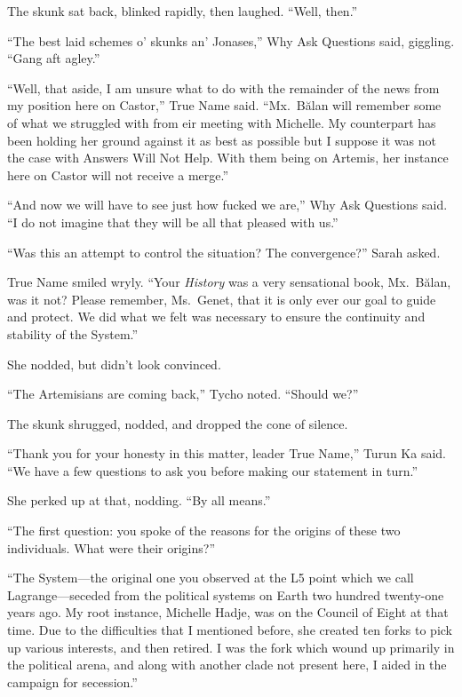 The skunk sat back, blinked rapidly, then laughed. ``Well, then.''

``The best laid schemes o' skunks an' Jonases,'' Why Ask Questions said, giggling. ``Gang aft agley.''

``Well, that aside, I am unsure what to do with the remainder of the news from my position here on Castor,'' True Name said. ``Mx.~Bălan will remember some of what we struggled with from eir meeting with Michelle. My counterpart has been holding her ground against it as best as possible but I suppose it was not the case with Answers Will Not Help. With them being on Artemis, her instance here on Castor will not receive a merge.''

``And now we will have to see just how fucked we are,'' Why Ask Questions said. ``I do not imagine that they will be all that pleased with us.''

``Was this an attempt to control the situation? The convergence?'' Sarah asked.

True Name smiled wryly. ``Your \emph{History} was a very sensational book, Mx.~Bălan, was it not? Please remember, Ms.~Genet, that it is only ever our goal to guide and protect. We did what we felt was necessary to ensure the continuity and stability of the System.''

She nodded, but didn't look convinced.

``The Artemisians are coming back,'' Tycho noted. ``Should we?''

The skunk shrugged, nodded, and dropped the cone of silence.

``Thank you for your honesty in this matter, leader True Name,'' Turun Ka said. ``We have a few questions to ask you before making our statement in turn.''

She perked up at that, nodding. ``By all means.''

``The first question: you spoke of the reasons for the origins of these two individuals. What were their origins?''

``The System—the original one you observed at the L5 point which we call Lagrange—seceded from the political systems on Earth two hundred twenty-one years ago. My root instance, Michelle Hadje, was on the Council of Eight at that time. Due to the difficulties that I mentioned before, she created ten forks to pick up various interests, and then retired. I was the fork which wound up primarily in the political arena, and along with another clade not present here, I aided in the campaign for secession.''

